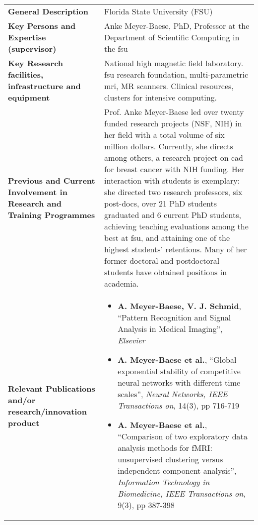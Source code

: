 {\fontsize{9bp}{1em}\selectfont
\noindent\begin{tabular}{>{\raggedright}p{}p{}}
  \multicolumn{2}{l}{\textbf{Partner Organisation Florida State University}} \\\midrule
\textbf{General Description} &
Florida State University (FSU)
\\\midrule
\textbf{Key Persons and Expertise (supervisor)} &
Anke Meyer-Baese, PhD, Professor at the Department of Scientific Computing in the \ac{fsu}
\\\midrule
\textbf{Key Research facilities, infrastructure and equipment} &
National high magnetic field laboratory. \ac{fsu} research foundation, multi-parametric \ac{mri}, MR scanners. Clinical resources, clusters for intensive computing.
\\\midrule
\textbf{Previous and Current Involvement in Research and Training Programmes} &
Prof. Anke Meyer-Baese led over twenty funded research projects (NSF, NIH) in her field with a total volume of six million dollars.
Currently, she directs among others, a research project on \ac{cad} for breast cancer with NIH funding.
Her interaction with students is exemplary: she directed two research professors, six post-docs, over 21 PhD students graduated and 6 current PhD students, achieving teaching evaluations among the best at \ac{fsu}, and attaining one of the highest students' retentions. Many of her former doctoral and postdoctoral students have obtained positions in academia.
\\\midrule
\textbf{Relevant Publications and/or research/innovation product} &
\begin{itemize}[noitemsep]
\item \textbf{A. Meyer-Baese, V. J. Schmid}, ``Pattern Recognition and Signal Analysis in Medical Imaging'', \textit{Elsevier}
\item \textbf{A. Meyer-Baese et al.}, ``Global exponential stability of competitive neural networks with different time scales'', \textit{Neural Networks, IEEE Transactions on}, 14(3), pp 716-719
\item \textbf{A. Meyer-Baese et al.}, ``Comparison of two exploratory data analysis methods for fMRI: unsupervised clustering versus independent component analysis'', \textit{Information Technology in Biomedicine, IEEE Transactions on}, 9(3), pp 387-398
\end{itemize}
\\\bottomrule
\end{tabular}}

